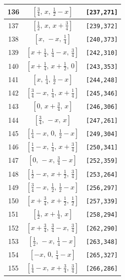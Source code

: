 \documentclass[fleqn,8pt]{jsarticle}
\begin{document}
\begin{longtable}{ccc}
136 & $\left[ \frac{3}{4},\, x,\, \frac{1}{2} - x \right]$ & {\tt [237,271]} \\ \hline
137 & $\left[ \frac{1}{2},\, x,\, x + \frac{3}{4} \right]$ & {\tt [239,372]} \\ \hline
138 & $\left[ x,\, - x,\, \frac{1}{4} \right]$ & {\tt [240,373]} \\ \hline
139 & $\left[ x + \frac{1}{4},\, \frac{1}{4} - x,\, \frac{3}{4} \right]$ & {\tt [242,310]} \\ \hline
140 & $\left[ x + \frac{1}{4},\, x + \frac{1}{2},\, 0 \right]$ & {\tt [243,353]} \\ \hline
141 & $\left[ x,\, \frac{1}{4},\, \frac{1}{2} - x \right]$ & {\tt [244,248]} \\ \hline
142 & $\left[ \frac{3}{4} - x,\, \frac{1}{4},\, x + \frac{1}{4} \right]$ & {\tt [245,346]} \\ \hline
143 & $\left[ 0,\, x + \frac{3}{4},\, x \right]$ & {\tt [246,306]} \\ \hline
144 & $\left[ \frac{3}{4},\, - x,\, x \right]$ & {\tt [247,261]} \\ \hline
145 & $\left[ \frac{1}{4} - x,\, 0,\, \frac{1}{2} - x \right]$ & {\tt [249,304]} \\ \hline
146 & $\left[ \frac{1}{4} - x,\, \frac{1}{4},\, x + \frac{3}{4} \right]$ & {\tt [250,341]} \\ \hline
147 & $\left[ 0,\, - x,\, \frac{3}{4} - x \right]$ & {\tt [252,359]} \\ \hline
148 & $\left[ \frac{1}{2} - x,\, x + \frac{1}{2},\, \frac{3}{4} \right]$ & {\tt [253,264]} \\ \hline
149 & $\left[ \frac{3}{4} - x,\, \frac{1}{2},\, \frac{1}{2} - x \right]$ & {\tt [256,297]} \\ \hline
150 & $\left[ x + \frac{3}{4},\, x + \frac{1}{2},\, \frac{1}{2} \right]$ & {\tt [257,339]} \\ \hline
151 & $\left[ \frac{1}{2},\, x + \frac{1}{4},\, x \right]$ & {\tt [258,294]} \\ \hline
152 & $\left[ x + \frac{3}{4},\, \frac{3}{4} - x,\, \frac{3}{4} \right]$ & {\tt [262,290]} \\ \hline
153 & $\left[ \frac{1}{2},\, - x,\, \frac{1}{4} - x \right]$ & {\tt [263,348]} \\ \hline
154 & $\left[ - x,\, 0,\, \frac{1}{4} - x \right]$ & {\tt [265,327]} \\ \hline
155 & $\left[ \frac{1}{4} - x,\, x + \frac{3}{4},\, \frac{3}{4} \right]$ & {\tt [266,286]} \\ \hline

\end{longtable}
\end{document}
